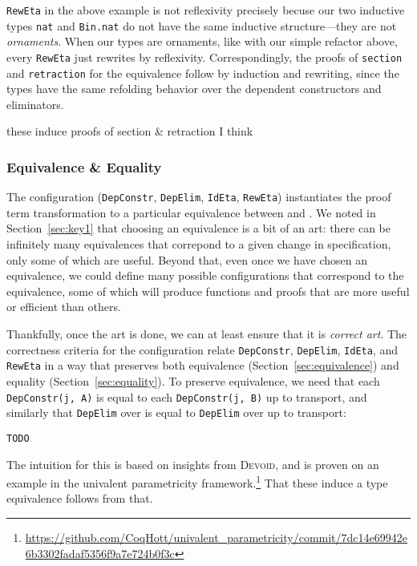\lstinline{RewEta} in the above example is not reflexivity precisely becuse our two inductive types
\lstinline{nat} and \lstinline{Bin.nat} do not have the same inductive structure---they are not \textit{ornaments}. %
When our types are ornaments, like with our simple refactor above, every \lstinline{RewEta} just rewrites by reflexivity.
Correspondingly, the proofs of \lstinline{section} and \lstinline{retraction} for the equivalence
follow by induction and rewriting, since the types have the same refolding behavior over the dependent constructors
and eliminators.

these induce proofs of section \& retraction I think

\subsubsection{Equivalence \& Equality}
\label{sec:art}

The configuration (\lstinline{DepConstr}, \lstinline{DepElim}, \lstinline{IdEta}, \lstinline{RewEta}) instantiates
the proof term transformation to a particular equivalence between \A and \B.
We noted in Section~\ref{sec:key1} that choosing an equivalence is a bit of an art:
there can be infinitely many equivalences that correpond to a 
given change in specification, only some of which are useful.
Beyond that, even once we have chosen an equivalence, we could define many possible configurations that correspond
to the equivalence, some of which will produce functions and proofs that are more useful or efficient than others.

Thankfully, once the art is done, we can at least ensure that it is \textit{correct art}.
The correctness criteria for the configuration relate \lstinline{DepConstr}, \lstinline{DepElim}, \lstinline{IdEta}, and \lstinline{RewEta}
in a way that preserves both equivalence (Section~\ref{sec:equivalence}) and equality (Section~\ref{sec:equality}).
To preserve equivalence, we need that each \lstinline{DepConstr(j, A)} is equal to each \lstinline{DepConstr(j, B)} up to transport,
and similarly that \lstinline{DepElim} over \A is equal to \lstinline{DepElim} over \B up to transport:

\begin{lstlisting}
TODO
\end{lstlisting}
The intuition for this is based on insights from \textsc{Devoid},
and is proven on an example in the univalent parametricity framework.\footnote{\url{https://github.com/CoqHott/univalent_parametricity/commit/7dc14e69942e6b3302fadaf5356f9a7e724b0f3c}}
That these induce a type equivalence follows from that.

